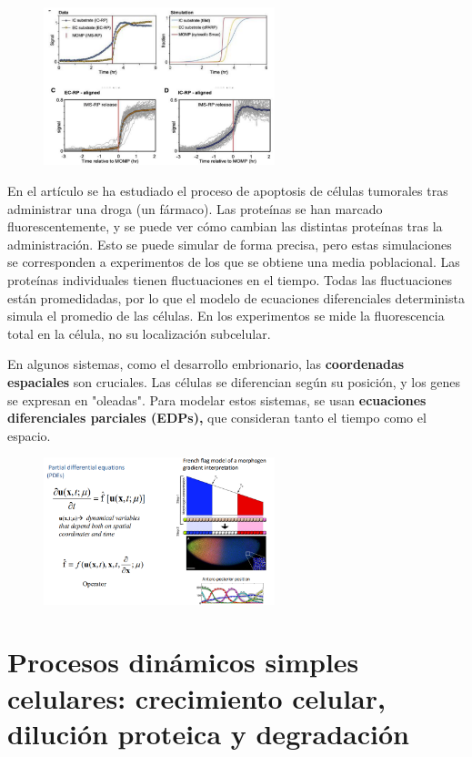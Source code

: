 \begin{figure}[h]
\centering
\includegraphics[width = 0.6\textwidth]{figs/simul-cells.png}
\end{figure}

En el artículo se ha estudiado el proceso de apoptosis de células tumorales tras administrar una droga (un fármaco). Las proteínas se han marcado fluorescentemente, y se puede ver cómo cambian las distintas proteínas tras la administración. Esto se puede simular de forma precisa, pero estas simulaciones se corresponden a experimentos de los que se obtiene una media poblacional. Las proteínas individuales tienen fluctuaciones en el tiempo. Todas las fluctuaciones están promedidadas, por lo que el modelo de ecuaciones diferenciales determinista simula el promedio de las células. En los experimentos se mide la fluorescencia total en la célula, no su localización subcelular.

En algunos sistemas, como el desarrollo embrionario, las \textbf{coordenadas espaciales} son cruciales. Las células se diferencian según su posición, y los genes se expresan en "oleadas". Para modelar estos sistemas, se usan \textbf{ecuaciones diferenciales parciales (EDPs),} que consideran tanto el tiempo como el espacio.

\begin{figure}[h]
\centering
\includegraphics[width = 0.6\textwidth]{figs/pde-embryo.png}
\end{figure}

\section{Procesos dinámicos simples celulares: crecimiento celular, dilución proteica y degradación}
